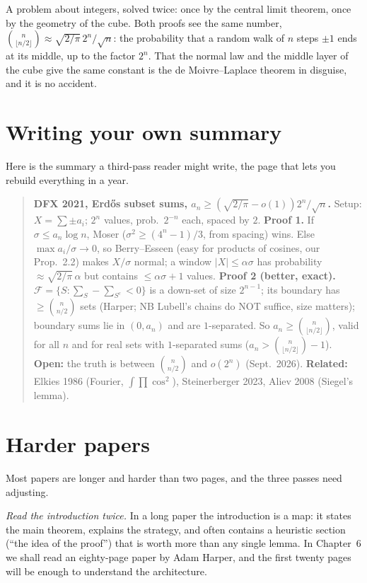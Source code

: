 \begin{beauty}
A problem about integers, solved twice: once by the central limit theorem, once by the geometry of the cube. Both proofs
see the same number, $\binom n{\lfloor n/2\rfloor}\approx\sqrt{2/\pi}\,2^n/\sqrt n$: the probability that a random walk of $n$ steps $\pm1$ ends at its middle, up to the factor $2^n$. That the
normal law and the middle layer of the cube give the same constant is the de Moivre--Laplace theorem in disguise, and it is no accident.
\end{beauty}

\section{Writing your own summary}

Here is the summary a third-pass reader might write, the page that lets you rebuild everything in a year.

\begin{quote}\small
\textbf{DFX 2021, Erd\H os subset sums, $a_n\ge(\sqrt{2/\pi}-o(1))2^n/\sqrt n$.} Setup: $X=\sum\pm a_i$; $2^n$ values, prob.\ $2^{-n}$ each, spaced by $2$. \textbf{Proof 1.} If $\sigma\le a_n\log n$,
Moser ($\sigma^2\ge(4^n-1)/3$, from spacing) wins. Else $\max a_i/\sigma\to0$, so Berry--Esseen (easy for products of cosines, our Prop.~2.2) makes $X/\sigma$ normal; a window
$|X|\le\alpha\sigma$ has probability $\approx\sqrt{2/\pi}\,\alpha$ but contains $\le\alpha\sigma+1$ values. \textbf{Proof 2 (better, exact).} $\mathcal F=\{S:\sum_S-\sum_{S^c}<0\}$ is a down-set of size $2^{n-1}$; its boundary has
$\ge\binom n{n/2}$ sets (Harper; NB Lubell's chains do NOT suffice, size matters); boundary sums lie in $(0,a_n)$ and are $1$-separated. So $a_n\ge\binom n{\lfloor n/2\rfloor}$, valid for all $n$ and for
real sets with $1$-separated sums ($a_n>\binom n{\lfloor n/2\rfloor}-1$). \textbf{Open:} the truth is between $\binom n{n/2}$ and $o(2^n)$ (Sept.\ 2026). \textbf{Related:} Elkies 1986 (Fourier, $\int\prod\cos^2$),
Steinerberger 2023, Aliev 2008 (Siegel's lemma).
\end{quote}

\section{Harder papers}

Most papers are longer and harder than two pages, and the three passes need adjusting.

\emph{Read the introduction twice.} In a long paper the introduction is a map: it states the main theorem, explains the strategy, and often contains
a heuristic section (``the idea of the proof'') that is worth more than any single lemma. In Chapter~6 we shall read an eighty-page paper by Adam
Harper, and the first twenty pages will be enough to understand the architecture.

